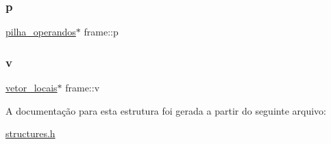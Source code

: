 \mbox{\label{structframe_a6aa3e7c39989aa1477fd946643f521fe}} 
\subsubsection{\texorpdfstring{p}{p}}
{\footnotesize\ttfamily \hyperlink{structpilha__operandos}{pilha\+\_\+operandos}$\ast$ frame\+::p}

\mbox{\label{structframe_a01ae11b1517de21c420c3c9a6a267401}} 
\subsubsection{\texorpdfstring{v}{v}}
{\footnotesize\ttfamily \hyperlink{structvetor__locais}{vetor\+\_\+locais}$\ast$ frame\+::v}



A documentação para esta estrutura foi gerada a partir do seguinte arquivo\+:\begin{DoxyCompactItemize}
\item 
\hyperlink{structures_8h}{structures.\+h}\end{DoxyCompactItemize}

